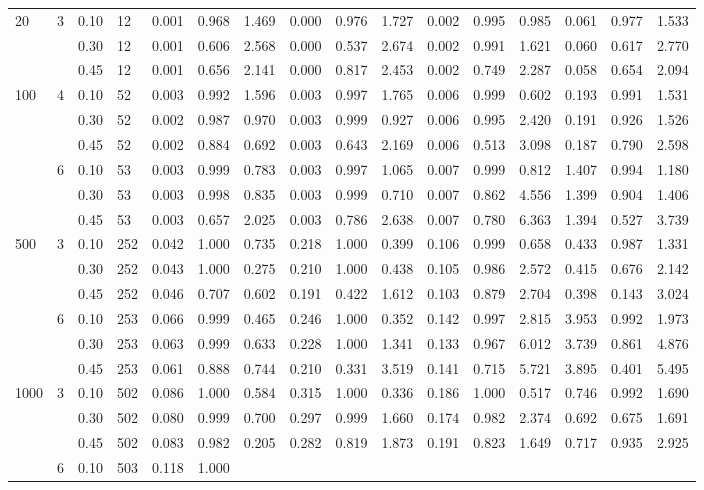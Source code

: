 \documentclass[thesis=B,english]{FITthesis}[2012/10/20]
\begin{document}
\begin{table}[h!]
\begin{adjustbox}{angle=90}
{\begin{tabular}{ll|l|l|r|r|r|r|r|r|r|r|r|r|r|r|}
                        20   & 3 & 0.10 & 12  &    0.001 &  0.968 &  1.469 &   0.000 &  0.976 &  1.727 &  0.002 &  0.995 &  0.985 &  0.061 &  0.977 &   1.533 \\     &   & 0.30 & 12  &    0.001 &  0.606 &  2.568 &   0.000 &  0.537 &  2.674 &  0.002 &  0.991 &  1.621 &  0.060 &  0.617 &   2.770 \\     &   & 0.45 & 12  &    0.001 &  0.656 &  2.141 &   0.000 &  0.817 &  2.453 &  0.002 &  0.749 &  2.287 &  0.058 &  0.654 &   2.094 \\100  & 4 & 0.10 & 52  &    0.003 &  0.992 &  1.596 &   0.003 &  0.997 &  1.765 &  0.006 &  0.999 &  0.602 &  0.193 &  0.991 &   1.531 \\     &   & 0.30 & 52  &    0.002 &  0.987 &  0.970 &   0.003 &  0.999 &  0.927 &  0.006 &  0.995 &  2.420 &  0.191 &  0.926 &   1.526 \\     &   & 0.45 & 52  &    0.002 &  0.884 &  0.692 &   0.003 &  0.643 &  2.169 &  0.006 &  0.513 &  3.098 &  0.187 &  0.790 &   2.598 \\     & 6 & 0.10 & 53  &    0.003 &  0.999 &  0.783 &   0.003 &  0.997 &  1.065 &  0.007 &  0.999 &  0.812 &  1.407 &  0.994 &   1.180 \\     &   & 0.30 & 53  &    0.003 &  0.998 &  0.835 &   0.003 &  0.999 &  0.710 &  0.007 &  0.862 &  4.556 &  1.399 &  0.904 &   1.406 \\     &   & 0.45 & 53  &    0.003 &  0.657 &  2.025 &   0.003 &  0.786 &  2.638 &  0.007 &  0.780 &  6.363 &  1.394 &  0.527 &   3.739 \\500  & 3 & 0.10 & 252 &    0.042 &  1.000 &  0.735 &   0.218 &  1.000 &  0.399 &  0.106 &  0.999 &  0.658 &  0.433 &  0.987 &   1.331 \\     &   & 0.30 & 252 &    0.043 &  1.000 &  0.275 &   0.210 &  1.000 &  0.438 &  0.105 &  0.986 &  2.572 &  0.415 &  0.676 &   2.142 \\     &   & 0.45 & 252 &    0.046 &  0.707 &  0.602 &   0.191 &  0.422 &  1.612 &  0.103 &  0.879 &  2.704 &  0.398 &  0.143 &   3.024 \\     & 6 & 0.10 & 253 &    0.066 &  0.999 &  0.465 &   0.246 &  1.000 &  0.352 &  0.142 &  0.997 &  2.815 &  3.953 &  0.992 &   1.973 \\     &   & 0.30 & 253 &    0.063 &  0.999 &  0.633 &   0.228 &  1.000 &  1.341 &  0.133 &  0.967 &  6.012 &  3.739 &  0.861 &   4.876 \\     &   & 0.45 & 253 &    0.061 &  0.888 &  0.744 &   0.210 &  0.331 &  3.519 &  0.141 &  0.715 &  5.721 &  3.895 &  0.401 &   5.495 \\1000 & 3 & 0.10 & 502 &    0.086 &  1.000 &  0.584 &   0.315 &  1.000 &  0.336 &  0.186 &  1.000 &  0.517 &  0.746 &  0.992 &   1.690 \\     &   & 0.30 & 502 &    0.080 &  0.999 &  0.700 &   0.297 &  0.999 &  1.660 &  0.174 &  0.982 &  2.374 &  0.692 &  0.675 &   1.691 \\     &   & 0.45 & 502 &    0.083 &  0.982 &  0.205 &   0.282 &  0.819 &  1.873 &  0.191 &  0.823 &  1.649 &  0.717 &  0.935 &   2.925 \\     & 6 & 0.10 & 503 &    0.118 &  1.000 & 
\end{tabular}}
\end{adjustbox}
\end{table}
\end{document}
